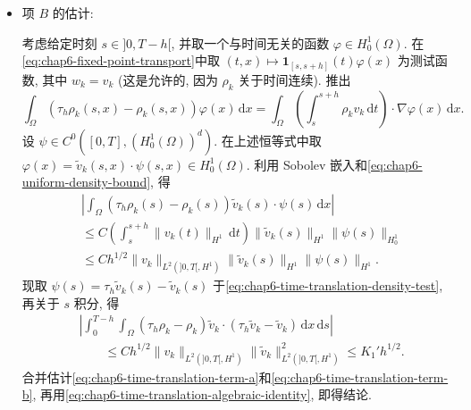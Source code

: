 \begin{sloppypar}
\begin{Proof}
\begin{itemize}
\[ \leq Ch^{1/4}\|\tau_h\widetilde v_k(s)-\widetilde v_k(s)\|_{H^1}.
 \]
 对这个不等式关于 $s$ 积分, 并使用\eqref{eq:chap6-uniform-energy-bound}, 得
 \begin{equation}
 \begin{aligned}
 &\left|\int_0^{T-h}\int_\Omega
 \bigl(\tau_h(\rho_k\widetilde v_k)(s)-\rho_k\widetilde v_k(s)\bigr)
 \cdot(\tau_h\widetilde v_k(s)-\widetilde v_k(s))\,\mathrm dx\,\mathrm ds\right|\\
 &\qquad\leq Ch^{1/4}\|\widetilde v_k\|_{L^2(0,T-h,H^1)}
 \leq K_1h^{1/4}.
 \end{aligned}
 \label{eq:chap6-time-translation-term-a}
 \end{equation}
 这就是\eqref{eq:chap6-time-translation-algebraic-identity}中项 $A$ 的估计.

 \item 项 $B$ 的估计:

 考虑给定时刻 $s\in]0,T-h[$, 并取一个与时间无关的函数 $\varphi\in H_0^1(\Omega)$. 在\eqref{eq:chap6-fixed-point-transport}中取
 $(t,x)\mapsto\mathbf1_{[s,s+h]}(t)\varphi(x)$ 为测试函数, 其中 $w_k=v_k$ (这是允许的, 因为 $\rho_k$ 关于时间连续). 推出
 \[
  \int_\Omega(\tau_h\rho_k(s,x)-\rho_k(s,x))\varphi(x)\,\mathrm dx
  =\int_\Omega\left(\int_s^{s+h}\rho_kv_k\,\mathrm dt\right)\cdot\nabla\varphi(x)\,\mathrm dx.
 \]
 设 $\psi\in C^0([0,T],(H_0^1(\Omega))^d)$. 在上述恒等式中取
 $\varphi(x)=\widetilde v_k(s,x)\cdot\psi(s,x)\in H_0^1(\Omega)$. 利用 Sobolev 嵌入和\eqref{eq:chap6-uniform-density-bound}, 得
 \begin{equation}
 \begin{aligned}
 &\left|\int_\Omega(\tau_h\rho_k(s)-\rho_k(s))\widetilde v_k(s)\cdot\psi(s)\,\mathrm dx\right|\\
 &\leq C\left(\int_s^{s+h}\|v_k(t)\|_{H^1}\,\mathrm dt\right)
 \|\widetilde v_k(s)\|_{H^1}\|\psi(s)\|_{H_0^1}\\
 &\leq Ch^{1/2}\|v_k\|_{L^2(]0,T[,H^1)}
 \|\widetilde v_k(s)\|_{H^1}\|\psi(s)\|_{H^1}.
 \end{aligned}
 \label{eq:chap6-time-translation-density-test}
 \end{equation}
 现取 $\psi(s)=\tau_h\widetilde v_k(s)-\widetilde v_k(s)$ 于\eqref{eq:chap6-time-translation-density-test}, 再关于 $s$ 积分, 得
 \begin{equation}
 \begin{aligned}
 &\left|\int_0^{T-h}\int_\Omega
 (\tau_h\rho_k-\rho_k)\widetilde v_k\cdot
 (\tau_h\widetilde v_k-\widetilde v_k)\,\mathrm dx\,\mathrm ds\right|\\
 &\qquad\leq Ch^{1/2}\|v_k\|_{L^2(]0,T[,H^1)}
 \|\widetilde v_k\|_{L^2(]0,T[,H^1)}^2
 \leq K_1'h^{1/2}.
 \end{aligned}
 \label{eq:chap6-time-translation-term-b}
 \end{equation}
 合并估计\eqref{eq:chap6-time-translation-term-a}和\eqref{eq:chap6-time-translation-term-b}, 再用\eqref{eq:chap6-time-translation-algebraic-identity}, 即得结论.
\end{itemize}
\end{Proof}


\end{sloppypar}
